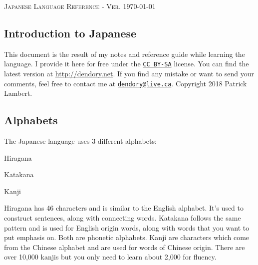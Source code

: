 \documentclass{article}
\begin{document}
\begin{CJK}{UTF8}{min}

\begin{center}
{\color{headings}\scshape\large{Japanese Language Reference - Ver. \today}}
\end{center}

\begin{multicols*}{3}

\section{Introduction to Japanese}

This document is the result of my notes and reference guide while learning the language. I provide it here for free under the 
\href{https://creativecommons.org/licenses/by-sa/4.0/}{\texttt{CC BY-SA}} license. You can find the latest version at \url{http://dendory.net}. If you find any mistake or want to 
send your comments, feel free to contact me at \href{mailto:dendory@live.ca}{\texttt{dendory@live.ca}}. Copyright 2018 Patrick Lambert.

\subsection{Alphabets}

The Japanese language uses 3 different alphabets:

\begin{colorize}
\item Hiragana
\item Katakana
\item Kanji
\end{colorize}

Hiragana has 46 characters and is similar to the English alphabet. It's used to construct sentences, along with connecting words. Katakana follows the same pattern and is used for 
English origin words, along with words that you want to put emphasis on. Both are phonetic alphabets. Kanji are characters which come from the Chinese alphabet and are used for words of 
Chinese origin. There are over 10,000 kanjis but you only need to learn about 2,000 for fluency.


\end{multicols*}
\end{CJK}
\end{document}
